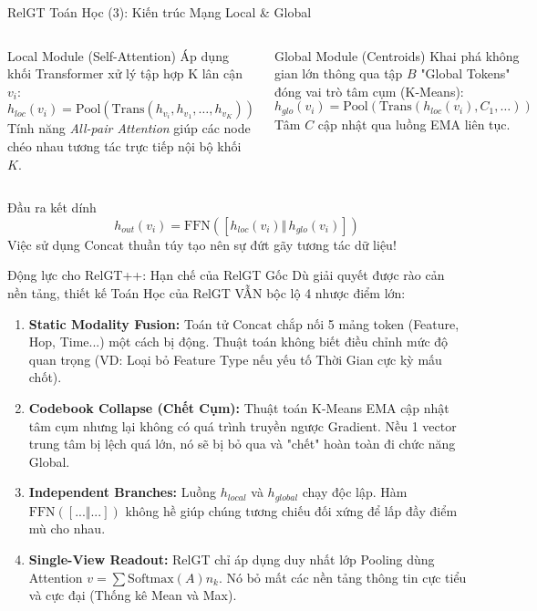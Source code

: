 \documentclass[aspectratio=169,11pt]{beamer}
\begin{document}
\begin{frame}{RelGT Toán Học (3): Kiến trúc Mạng Local \& Global}
\begin{columns}[T]
\begin{block}{Local Module (Self-Attention)}
\small Áp dụng khối Transformer xử lý tập hợp K lân cận $v_i$:
\[
h_{loc}(v_i) = \text{Pool}(\text{Trans}(h_{v_i}, h_{v_1}, \dots, h_{v_K}))
\]
Tính năng \textit{All-pair Attention} giúp các node chéo nhau tương tác trực tiếp nội bộ khối $K$.
\end{block}

\begin{block}{Global Module (Centroids)}
\small Khai phá không gian lớn thông qua tập $B$ "Global Tokens" đóng vai trò tâm cụm (K-Means):
\[
h_{glo}(v_i) = \text{Pool}(\text{Trans}(h_{loc}(v_i), C_1, \dots))
\]
Tâm $C$ cập nhật qua luồng EMA liên tục.
\end{block}
\end{columns}

\vspace{5pt}
\begin{alertblock}{Đầu ra kết dính}
\[
h_{out}(v_i) = \text{FFN}([h_{loc}(v_i) \Vert \,h_{glo}(v_i)])
\]
Việc sử dụng Concat thuần túy tạo nên sự đứt gãy tương tác dữ liệu!
\end{alertblock}
\end{frame}

\begin{frame}{Động lực cho RelGT++: Hạn chế của RelGT Gốc}
Dù giải quyết được rào cản nền tảng, thiết kế Toán Học của RelGT VẪN bộc lộ 4 nhược điểm lớn:

\begin{enumerate}
    \item \textbf{Static Modality Fusion:} Toán tử $\text{Concat}$ chắp nối 5 mảng token (Feature, Hop, Time...) một cách bị động. Thuật toán không biết điều chỉnh mức độ quan trọng (VD: Loại bỏ Feature Type nếu yếu tố Thời Gian cực kỳ mấu chốt).
    \item \textbf{Codebook Collapse (Chết Cụm):} Thuật toán K-Means EMA cập nhật tâm cụm nhưng lại không có quá trình truyền ngược Gradient. Nều 1 vector trung tâm bị lệch quá lớn, nó sẽ bị bỏ qua và "chết" hoàn toàn đi chức năng Global.
    \item \textbf{Independent Branches:} Luồng $h_{local}$ và $h_{global}$ chạy độc lập. Hàm $\text{FFN}([... \Vert ...])$ không hề giúp chúng tương chiếu đối xứng để lấp đầy điểm mù cho nhau.
    \item \textbf{Single-View Readout:} RelGT chỉ áp dụng duy nhất lớp Pooling dùng Attention $v = \sum \text{Softmax}(A) n_k$. Nó bỏ mất các nền tảng thông tin cực tiểu và cực đại (Thống kê Mean và Max).
\end{enumerate}
\end{frame}
\end{document}
